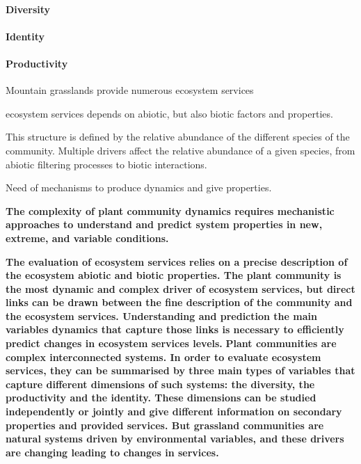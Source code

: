 \paragraph{Diversity}


\paragraph{Identity}

\paragraph{Productivity}
Mountain grasslands provide numerous ecosystem services 

ecosystem services depends on abiotic, but also biotic factors and properties. 

%

%


This structure is defined by the relative abundance of the different species of the community. Multiple drivers affect the relative abundance of a given species, from abiotic filtering processes to biotic interactions. 

Need of mechanisms to produce dynamics and give properties.

\textbf{The complexity of plant community dynamics requires mechanistic approaches to understand and predict system properties in new, extreme, and variable conditions. }


\textbf{The evaluation of ecosystem services relies on a precise description of the ecosystem abiotic and biotic properties. The plant community is the most dynamic and complex driver of ecosystem services, but direct links can be drawn between the fine description of the community and the ecosystem services. Understanding and prediction the main variables dynamics that capture those links is necessary to efficiently predict changes in ecosystem services levels.}
\textbf{Plant communities are complex interconnected systems. In order to evaluate ecosystem services, they can be summarised by three main types of variables that capture different dimensions of such systems: the diversity, the productivity and the identity. These dimensions can be studied independently or jointly and give different information on secondary properties and provided services. But grassland communities are natural systems driven by environmental variables, and these drivers are changing leading to changes in services.}



